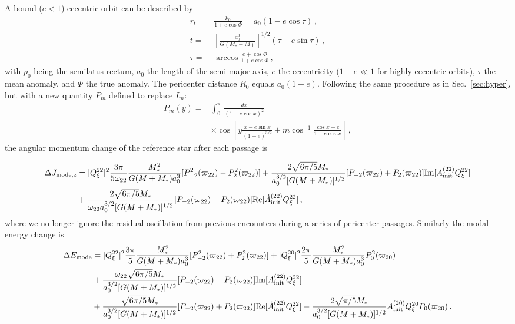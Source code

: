 \documentclass[prd,aps,floatfix,superscriptaddress,nofootinbib,twocolumn,10pt,English]{revtex4}
\begin{document}
A bound ($e<1$) eccentric orbit can be described by
\begin{align}
 r_t=& \frac{p_0}{1+e \cos \Phi} = a_0 (1-e \cos \tau)\,,\nonumber \\
 t= &\left [ \frac{a^3_0}{G(M_*+M)}\right ]^{1/2}(\tau - e \sin \tau)\,,\nonumber \\
 \tau=& \arccos \frac{e+\cos \Phi}{1+e \cos \Phi}\,,
 \end{align}
with $p_0$ being the semilatus rectum, $a_0$ the length of the semi-major axis, 
$e$ the eccentricity ($1-e \ll 1$ for highly eccentric orbits),
$\tau$ the mean anomaly, and $\Phi$ the true anomaly.
The pericenter distance $R_0$ equals $a_0(1-e)$. Following the same procedure as in Sec.~\ref{sec:hyper}, but with a new quantity $P_m$ defined to replace $I_m$:
 \begin{align}
 P_{m}(y)  =& \int^\pi_0  \, \frac{dx}{(1-e \cos x)^2} \nonumber \\
& \times \cos {\left [ y \frac{x -e \sin x}{(1-e)^{3/2}}+ m \cos^{-1} \frac{\cos x-e}{1-e \cos x} \right ] }\,,
 \end{align}
the angular momentum change of the reference star after each passage is

\begin{widetext}
\begin{align}\label{eqjinitd}
 \Delta J_{\rm mode,z} &= |Q^{22}_\xi|^2 \frac{3 \pi}{5 \omega_{22}} \frac{M^2_*}{G(M+M_*)a^3_0}[P^2_{-2}(\varpi_{22})-P^2_{2}(\varpi_{22})]
+ \frac{2 \sqrt{6 \pi/5} M_*}{a^{3/2}_0 [G(M+M_*)]^{1/2}} [P_{-2}(\varpi_{22})+P_{2}(\varpi_{22})] {\rm Im}[A^{(22)}_{\rm init} Q^{22}_\xi] \nonumber \\
&+ \frac{2 \sqrt{6 \pi/5} M_*}{\omega_{22} a^{3/2}_0 [G(M+M_*)]^{1/2}} [P_{-2}(\varpi_{22})-P_{2}(\varpi_{22})] {\rm Re}[\dot{A}^{(22)}_{\rm init} Q^{22}_\xi] \,,
   \end{align}
 where we no longer ignore the residual oscillation from previous encounters during a series of pericenter passages. Similarly the modal energy change is
 \begin{align}\label{eqeinitd}
  \Delta E_{\rm mode} & = |Q^{22}_\xi|^2 \frac{3 \pi}{5} \frac{M^2_*}{G(M+M_*)a^3_0}[P^2_{-2}(\varpi_{22})+P^2_{2}(\varpi_{22})]
 +|Q^{20}_\xi|^2 \frac{2 \pi}{5 } \frac{M^2_*}{G(M+M_*)a^3_0} P^2_{0}(\varpi_{20})\, \nonumber \\
 &+ \frac{ \omega_{22} \sqrt{6 \pi/5} M_*}{ a^{3/2}_0 [G(M+M_*)]^{1/2}} [P_{-2}(\varpi_{22})-P_{2}(\varpi_{22})] {\rm Im}[A^{(22)}_{\rm init} Q^{22}_\xi] \nonumber \\
 & +\frac{ \sqrt{6 \pi/5} M_*}{ a^{3/2}_0 [G(M+M_*)]^{1/2}} [P_{-2}(\varpi_{22})+P_{2}(\varpi_{22})] {\rm Re}[\dot{A}^{(22)}_{\rm init} Q^{22}_\xi] 
 - \frac{2\sqrt{\pi/5} M_*}{a^{3/2}_0 [G(M+M_*)]^{1/2}}\dot{A}^{(20)}_{\rm init} Q^{20}_\xi P_0(\varpi_{20})\,.
      \end{align} 
    
   
\end{widetext}
\end{document}
